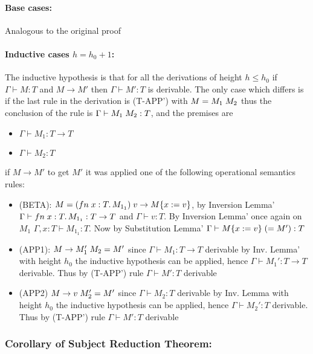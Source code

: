 \paragraph*{Base cases:\\}

Analogous to the original proof

\paragraph*{Inductive cases $h = h_0 + 1$:\\}
The inductive hypothesis is that for all the derivations of height $h \le h_0$ if
$\Gamma \vdash M: T$ and $M \to M'$ then $\Gamma \vdash M':T$ is derivable. The only case which
differs is if the last rule in the derivation is (T-APP') with $M = M_1\;M_2$ thus the
conclusion of the rule is $\Gamma \vdash M_1\;M_2: T$, and the premises are
\begin{itemize}
	\item $\Gamma \vdash M_1 : T \to T$
	\item $\Gamma \vdash M_2: T$
\end{itemize}
if $M \to M'$ to get $M'$ it was applied one of the following operational semantics rules:
\begin{itemize}
	\item (BETA): $M = (fn\;x: T.\,M_{1_1})\;v \to M\{x:=v\}$, by Inversion
	      Lemma'\\
	      $\Gamma \vdash fn\;x:T.\,M_{1_1}: T \to T$ and $\Gamma \vdash v: T$.
	      By Inversion Lemma' once again on $M_1$ $\Gamma, x: T \vdash M_{1_1}: T$.
	      Now by Substitution Lemma' $\Gamma \vdash M\{x:=v\}\;(= M'): T$
	\item (APP1): $M \to M_1'\;M_2 = M'$ since $\Gamma \vdash M_1: T \to T$
	      derivable by Inv. Lemma' with height $h_0$ the inductive hypothesis can be applied,
	      hence $\Gamma \vdash M_1': T \to T$ derivable. Thus by (T-APP') rule
	      $\Gamma \vdash M': T$ derivable
	\item (APP2) $M \to v\;M_2' = M'$ since $\Gamma \vdash M_2: T$ derivable by
	      Inv. Lemma with height $h_0$ the inductive hypothesis can be applied,
	      hence $\Gamma \vdash M_2': T$ derivable. Thus by (T-APP') rule
	      $\Gamma \vdash M': T$ derivable
\end{itemize}

\subsubsection*{Corollary of Subject Reduction Theorem:}

